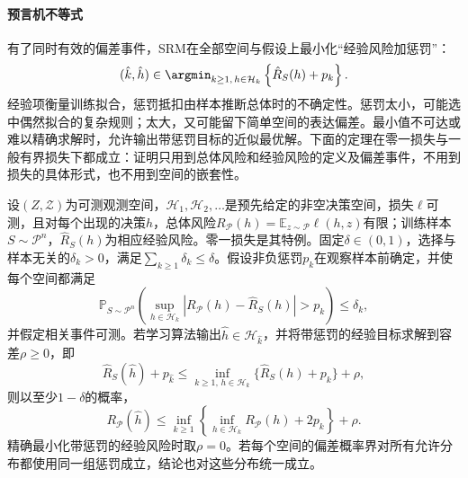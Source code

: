 \paragraph{预言机不等式}

有了同时有效的偏差事件，SRM在全部空间与假设上最小化“经验风险加惩罚”：
\begin{equation}
  (\hat k,\hat h)
  \in\argmin_{k\geq1,\,h\in\mathcal H_k}
  \left\{\hat R_S(h)+p_k\right\}.
  \label{eq:structural-risk-minimization}
\end{equation}
经验项衡量训练拟合，惩罚抵扣由样本推断总体时的不确定性。惩罚太小，可能选中偶然拟合的复杂规则；太大，又可能留下简单空间的表达偏差。最小值不可达或难以精确求解时，允许输出带惩罚目标的近似最优解。下面的定理在零一损失与一般有界损失下都成立：证明只用到总体风险和经验风险的定义及偏差事件，不用到损失的具体形式，也不用到空间的嵌套性。

\begin{theorem}[结构风险最小化的期望风险保证]
\label{thm:srm-oracle-bound}
设$(Z,\mathcal Z)$为可测观测空间，$\mathcal H_1,\mathcal H_2,\ldots$是预先给定的非空决策空间，损失$\ell$可测，且对每个出现的决策$h$，总体风险$R_{\mathcal P}(h)=\mathbb E_{z\sim\mathcal P}\ell(h,z)$有限；训练样本$S\sim\mathcal P^n$，$\hat R_S(h)$为相应经验风险。零一损失是其特例。固定$\delta\in(0,1)$，选择与样本无关的$\delta_k>0$，满足$\sum_{k\geq1}\delta_k\leq\delta$。假设非负惩罚$p_k$在观察样本前确定，并使每个空间都满足
\begin{equation}
 \mathbb P_{S\sim\mathcal P^n}\left(
 \sup_{h\in\mathcal H_k}
 |R_{\mathcal P}(h)-\hat R_S(h)|>p_k
 \right)\leq\delta_k,
 \label{eq:srm-classwise-confidence}
\end{equation}
并假定相关事件可测。若学习算法输出$\hat h\in\mathcal H_{\hat k}$，并将带惩罚的经验目标求解到容差$\rho\geq0$，即
\begin{equation}
 \hat R_S(\hat h)+p_{\hat k}
 \leq\inf_{k\geq1,\,h\in\mathcal H_k}
       \{\hat R_S(h)+p_k\}+\rho,
 \label{eq:srm-approximate-minimizer}
\end{equation}
则以至少$1-\delta$的概率，
\begin{equation}
 R_{\mathcal P}(\hat h)
 \leq\inf_{k\geq1}\left\{
       \inf_{h\in\mathcal H_k}R_{\mathcal P}(h)+2p_k
       \right\}+\rho.
 \label{eq:srm-oracle}
\end{equation}
精确最小化带惩罚的经验风险时取$\rho=0$。若每个空间的偏差概率界对所有允许分布都使用同一组惩罚成立，结论也对这些分布统一成立。
\end{theorem}

